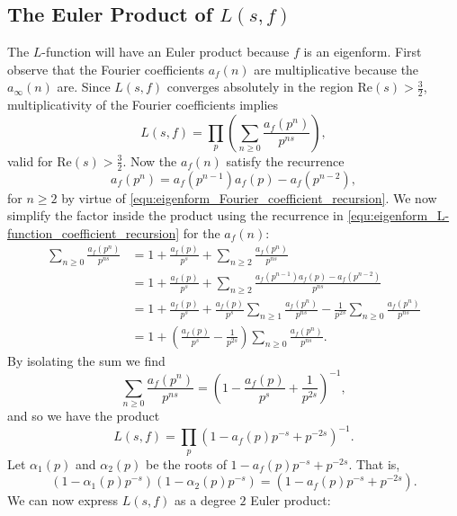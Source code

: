 \documentclass[12pt]{book}
\theoremstyle{definition}\newframedtheorem{method}{Method}
\renewcommand{\a}{\alpha}
\newcommand{\<}{\langle}
\renewcommand{\>}{\rangle}
\renewcommand{\Re}{\mathrm{Re}}
\begin{document}
    \subsection*{The Euler Product of \texorpdfstring{$L(s,f)$}{L(s,f)}}
      The $L$-function will have an Euler product because $f$ is an eigenform. First observe that the Fourier coefficients $a_{f}(n)$ are multiplicative because the $a_{\infty}(n)$ are. Since $L(s,f)$ converges absolutely in the region $\Re(s) > \frac{3}{2}$, multiplicativity of the Fourier coefficients implies
      \[
        L(s,f) = \prod_{p}\left(\sum_{n \ge 0}\frac{a_{f}(p^{n})}{p^{ns}}\right),
      \]
      valid for $\Re(s) > \frac{3}{2}$. Now the $a_{f}(n)$ satisfy the recurrence
      \begin{equation}\label{equ:eigenform_L-function_coefficient_recursion}
        a_{f}(p^{n}) = a_{f}(p^{n-1})a_{f}(p)-a_{f}(p^{n-2}),
      \end{equation}
      for $n \ge 2$ by virtue of \cref{equ:eigenform_Fourier_coefficient_recursion}. We now simplify the factor inside the product using the recurrence in \cref{equ:eigenform_L-function_coefficient_recursion} for the $a_{f}(n)$:
      \begin{align*}
        \sum_{n \ge 0}\frac{a_{f}(p^{n})}{p^{ns}} &= 1+\frac{a_{f}(p)}{p^{s}}+\sum_{n \ge 2}\frac{a_{f}(p^{n})}{p^{ns}} \\
        &= 1+\frac{a_{f}(p)}{p^{s}}+\sum_{n \ge 2}\frac{a_{f}(p^{n-1})a_{f}(p)-a_{f}(p^{n-2})}{p^{ns}} \\
        &= 1+\frac{a_{f}(p)}{p^{s}}+\frac{a_{f}(p)}{p^{s}}\sum_{n \ge 1}\frac{a_{f}(p^{n})}{p^{ns}}-\frac{1}{p^{2s}}\sum_{n \ge 0}\frac{a_{f}(p^{n})}{p^{ns}} \\
        &= 1+\left(\frac{a_{f}(p)}{p^{s}}-\frac{1}{p^{2s}}\right)\sum_{n \ge 0}\frac{a_{f}(p^{n})}{p^{ns}}.
      \end{align*}
      By isolating the sum we find
      \[
        \sum_{n \ge 0}\frac{a_{f}(p^{n})}{p^{ns}} = \left(1-\frac{a_{f}(p)}{p^{s}}+\frac{1}{p^{2s}}\right)^{-1},
      \]
      and so we have the product
      \[
        L(s,f) = \prod_{p}(1-a_{f}(p)p^{-s}+p^{-2s})^{-1}.
      \]
      Let $\a_{1}(p)$ and $\a_{2}(p)$ be the roots of $1-a_{f}(p)p^{-s}+p^{-2s}$. That is,
      \begin{equation}\label{equ:local_parameter_definition_modfular_forms}
        (1-\a_{1}(p)p^{-s})(1-\a_{2}(p)p^{-s}) = (1-a_{f}(p)p^{-s}+p^{-2s}).
      \end{equation}
      We can now express $L(s,f)$ as a degree $2$ Euler product:
\end{document}
